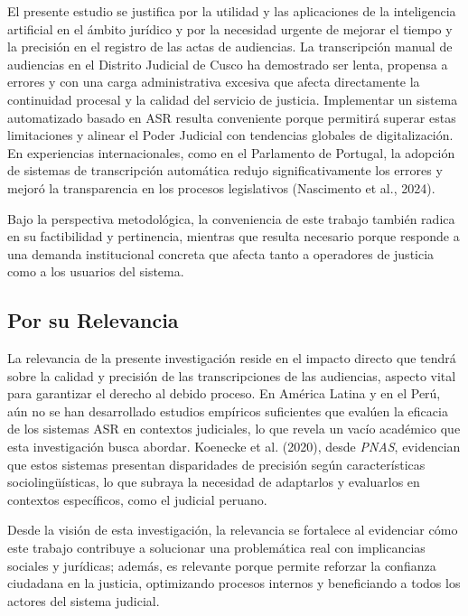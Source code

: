 \documentclass[12pt,a4paper,oneside]{report}
\begin{document}
El presente estudio se justifica por la utilidad y las aplicaciones de la inteligencia artificial en el ámbito jurídico y por la necesidad urgente de mejorar el tiempo y la precisión en el registro de las actas de audiencias. La transcripción manual de audiencias en el Distrito Judicial de Cusco ha demostrado ser lenta, propensa a errores y con una carga administrativa excesiva que afecta directamente la continuidad procesal y la calidad del servicio de justicia. Implementar un sistema automatizado basado en ASR resulta conveniente porque permitirá superar estas limitaciones y alinear el Poder Judicial con tendencias globales de digitalización. En experiencias internacionales, como en el Parlamento de Portugal, la adopción de sistemas de transcripción automática redujo significativamente los errores y mejoró la transparencia en los procesos legislativos (Nascimento et al., 2024).

Bajo la perspectiva metodológica, la conveniencia de este trabajo también radica en su factibilidad y pertinencia, mientras que resulta necesario porque responde a una demanda institucional concreta que afecta tanto a operadores de justicia como a los usuarios del sistema.

\subsection{Por su Relevancia}

La relevancia de la presente investigación reside en el impacto directo que tendrá sobre la calidad y precisión de las transcripciones de las audiencias, aspecto vital para garantizar el derecho al debido proceso. En América Latina y en el Perú, aún no se han desarrollado estudios empíricos suficientes que evalúen la eficacia de los sistemas ASR en contextos judiciales, lo que revela un vacío académico que esta investigación busca abordar. Koenecke et al. (2020), desde \textit{PNAS}, evidencian que estos sistemas presentan disparidades de precisión según características sociolingüísticas, lo que subraya la necesidad de adaptarlos y evaluarlos en contextos específicos, como el judicial peruano.

Desde la visión de esta investigación, la relevancia se fortalece al evidenciar cómo este trabajo contribuye a solucionar una problemática real con implicancias sociales y jurídicas; además, es relevante porque permite reforzar la confianza ciudadana en la justicia, optimizando procesos internos y beneficiando a todos los actores del sistema judicial.
\end{document}
